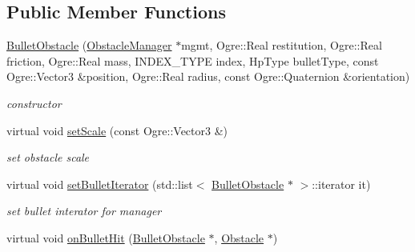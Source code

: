 \subsection*{Public Member Functions}
\begin{DoxyCompactItemize}
\item 
\hyperlink{class_n_c_t_u_1_1_bullet_obstacle_a8ceaf3442116803582d703e6326b610a}{Bullet\+Obstacle} (\hyperlink{class_n_c_t_u_1_1_obstacle_manager}{Obstacle\+Manager} $\ast$mgmt, Ogre\+::\+Real restitution, Ogre\+::\+Real friction, Ogre\+::\+Real mass, I\+N\+D\+E\+X\+\_\+\+T\+Y\+PE index, Hp\+Type bullet\+Type, const Ogre\+::\+Vector3 \&position, Ogre\+::\+Real radius, const Ogre\+::\+Quaternion \&orientation)
\begin{DoxyCompactList}\small\item\em constructor \end{DoxyCompactList}\item 
virtual void \hyperlink{class_n_c_t_u_1_1_bullet_obstacle_a0e7b291970133412b00a30e8c5f65a19}{set\+Scale} (const Ogre\+::\+Vector3 \&)\hypertarget{class_n_c_t_u_1_1_bullet_obstacle_a0e7b291970133412b00a30e8c5f65a19}{}\label{class_n_c_t_u_1_1_bullet_obstacle_a0e7b291970133412b00a30e8c5f65a19}

\begin{DoxyCompactList}\small\item\em set obstacle scale \end{DoxyCompactList}\item 
virtual void \hyperlink{class_n_c_t_u_1_1_bullet_obstacle_a51c61e74c5e7b6918ea98343109cee50}{set\+Bullet\+Iterator} (std\+::list$<$ \hyperlink{class_n_c_t_u_1_1_bullet_obstacle}{Bullet\+Obstacle} $\ast$ $>$\+::iterator it)\hypertarget{class_n_c_t_u_1_1_bullet_obstacle_a51c61e74c5e7b6918ea98343109cee50}{}\label{class_n_c_t_u_1_1_bullet_obstacle_a51c61e74c5e7b6918ea98343109cee50}

\begin{DoxyCompactList}\small\item\em set bullet interator for manager \end{DoxyCompactList}\item 
virtual void \hyperlink{class_n_c_t_u_1_1_bullet_obstacle_afb9241ee7ed793b39cb8f60b5f1132ac}{on\+Bullet\+Hit} (\hyperlink{class_n_c_t_u_1_1_bullet_obstacle}{Bullet\+Obstacle} $\ast$, \hyperlink{class_n_c_t_u_1_1_obstacle}{Obstacle} $\ast$)\hypertarget{class_n_c_t_u_1_1_bullet_obstacle_afb9241ee7ed793b39cb8f60b5f1132ac}{}\label{class_n_c_t_u_1_1_bullet_obstacle_afb9241ee7ed793b39cb8f60b5f1132ac}


\end{DoxyCompactItemize}
